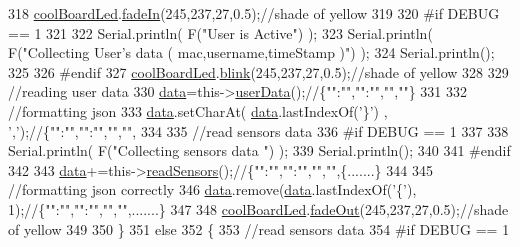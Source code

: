 \begin{DoxyCode}
318         \hyperlink{classCoolBoard_a1b1d3c684a5baa56b08486e192fd8e97}{coolBoardLed}.\hyperlink{classCoolBoardLed_ab778f5e7bed0ab74e3906d82110493c3}{fadeIn}(245,237,27,0.5);\textcolor{comment}{//shade of yellow}
319     
320 \textcolor{preprocessor}{    #if DEBUG == 1}
321 
322         Serial.println( F(\textcolor{stringliteral}{"User is Active"}) );
323         Serial.println( F(\textcolor{stringliteral}{"Collecting User's data ( mac,username,timeStamp )"}) );
324         Serial.println();
325     
326 \textcolor{preprocessor}{    #endif  }
327         \hyperlink{classCoolBoard_a1b1d3c684a5baa56b08486e192fd8e97}{coolBoardLed}.\hyperlink{classCoolBoardLed_a96e1ea13003eee34c9dbcef340404426}{blink}(245,237,27,0.5);\textcolor{comment}{//shade of yellow   }
328 
329         \textcolor{comment}{//reading user data}
330         \hyperlink{classCoolBoard_a427fb753dd8575bdf821c70a5c63d695}{data}=this->\hyperlink{classCoolBoard_ae7358fb6e623cfc81b775f5f1734909b}{userData}();\textcolor{comment}{//\{"":"","":"","",""\}}
331 
332         \textcolor{comment}{//formatting json }
333         \hyperlink{classCoolBoard_a427fb753dd8575bdf821c70a5c63d695}{data}.setCharAt( \hyperlink{classCoolBoard_a427fb753dd8575bdf821c70a5c63d695}{data}.lastIndexOf(\textcolor{charliteral}{'\}'}) , \textcolor{charliteral}{','});\textcolor{comment}{//\{"":"","":"","","",}
334                 
335         \textcolor{comment}{//read sensors data}
336 \textcolor{preprocessor}{    #if DEBUG == 1}
337 
338         Serial.println( F(\textcolor{stringliteral}{"Collecting sensors data "}) );
339         Serial.println();
340     
341 \textcolor{preprocessor}{    #endif}
342 
343         \hyperlink{classCoolBoard_a427fb753dd8575bdf821c70a5c63d695}{data}+=this->\hyperlink{classCoolBoard_ad03abdce2e65f520bbf2cff0f2d083cf}{readSensors}();\textcolor{comment}{//\{"":"","":"","","",\{.......\}     }
344 
345         \textcolor{comment}{//formatting json correctly}
346         \hyperlink{classCoolBoard_a427fb753dd8575bdf821c70a5c63d695}{data}.remove(\hyperlink{classCoolBoard_a427fb753dd8575bdf821c70a5c63d695}{data}.lastIndexOf(\textcolor{charliteral}{'\{'}), 1);\textcolor{comment}{//\{"":"","":"","","",.......\}}
347         
348         \hyperlink{classCoolBoard_a1b1d3c684a5baa56b08486e192fd8e97}{coolBoardLed}.\hyperlink{classCoolBoardLed_a93d545679237e8cc858324367149775c}{fadeOut}(245,237,27,0.5);\textcolor{comment}{//shade of yellow}
349                 
350     \}   
351     \textcolor{keywordflow}{else}
352     \{
353         \textcolor{comment}{//read sensors data}
354 \textcolor{preprocessor}{    #if DEBUG == 1}

\end{DoxyCode}
